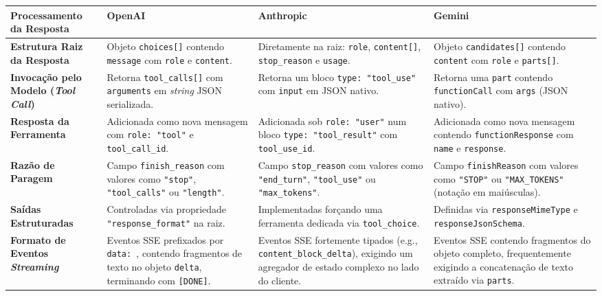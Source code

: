 \begin{table}[H]
    \centering
    \footnotesize
    \renewcommand{\arraystretch}{1.4}
    \begin{tabularx}{\textwidth}{|>{\raggedright\arraybackslash}p{2.8cm}|Y|Y|Y|}
        \hline
        \textbf{Processamento da Resposta} & \textbf{OpenAI} & \textbf{Anthropic} & \textbf{Gemini} \\
        \hline
        \textbf{Estrutura Raiz da Resposta} & Objeto \texttt{choices[]} contendo \texttt{message} com \texttt{role} e \texttt{content}. & Diretamente na raiz: \texttt{role}, \texttt{content[]}, \texttt{stop\_reason} e \texttt{usage}. & Objeto \texttt{candidates[]} contendo \texttt{content} com \texttt{role} e \texttt{parts[]}. \\
        \hline
        \textbf{Invocação pelo Modelo (\textit{Tool Call})} & Retorna \texttt{tool\_calls[]} com \texttt{arguments} em \textit{string} JSON serializada. & Retorna um bloco \texttt{type: "tool\_use"} com \texttt{input} em JSON nativo. & Retorna uma \texttt{part} contendo \texttt{functionCall} com \texttt{args} (JSON nativo). \\
        \hline
        \textbf{Resposta da Ferramenta} & Adicionada como nova mensagem com \texttt{role: "tool"} e \texttt{tool\_call\_id}. & Adicionada sob \texttt{role: "user"} num bloco \texttt{type: "tool\_result"} com \texttt{tool\_use\_id}. & Adicionada como nova mensagem contendo \texttt{functionResponse} com \texttt{name} e \texttt{response}. \\
        \hline
        \textbf{Razão de Paragem} & Campo \texttt{finish\_reason} com valores como \texttt{"stop"}, \texttt{"tool\_calls"} ou \texttt{"length"}. & Campo \texttt{stop\_reason} com valores como \texttt{"end\_turn"}, \texttt{"tool\_use"} ou \texttt{"max\_tokens"}. & Campo \texttt{finishReason} com valores como \texttt{"STOP"} ou \texttt{"MAX\_TOKENS"} (notação em maiúsculas). \\
        \hline
        \textbf{Saídas Estruturadas} & Controladas via propriedade \texttt{"response\_format"} na raiz. & Implementadas forçando uma ferramenta dedicada via \texttt{tool\_choice}. & Definidas via \texttt{response}\allowbreak\texttt{MimeType} e \texttt{response}\allowbreak\texttt{JsonSchema}. \\
        \hline
        \textbf{Formato de Eventos \textit{Streaming}} & Eventos SSE prefixados por \texttt{data:\ }, contendo fragmentos de texto no objeto \texttt{delta}, terminando com \texttt{[DONE]}. & Eventos SSE fortemente tipados (e.g., \texttt{content\_block\_delta}), exigindo um agregador de estado complexo no lado do cliente. & Eventos SSE contendo fragmentos do objeto completo, frequentemente exigindo a concatenação de texto extraído via \texttt{parts}. \\

\end{tabularx}
\end{table}
